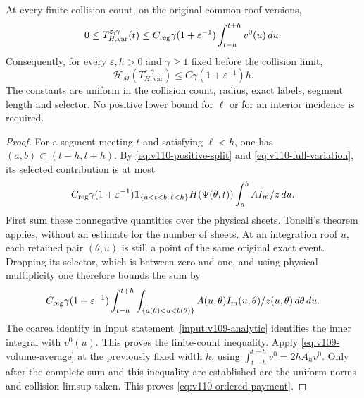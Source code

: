 \begin{theorem}
\label{thm:v110-payment}
At every finite collision count, on the original common roof versions,
\begin{equation}\label{eq:v110-finite-payment}
 0\le T_{H,\mathrm{var}}^{\varepsilon,\gamma}(t)
 \le C_{\rm reg}\gamma(1+\varepsilon^{-1})
                         \int_{t-h}^{t+h}v^0(u)\,du.
\end{equation}
Consequently, for every $\varepsilon,h>0$ and $\gamma\ge1$ fixed
before the collision limit,
\begin{equation}\label{eq:v110-ordered-payment}
 \mathcal H_M(T_{H,\mathrm{var}}^{\varepsilon,\gamma})
                  \le C\gamma(1+\varepsilon^{-1})h.
\end{equation}
The constants are uniform in the collision count, radius, exact
labels, segment length and selector. No positive lower bound for
$\ell$ or for an interior incidence is required.
\end{theorem}
\begin{proof}
For a segment meeting $t$ and satisfying $\ell<h$, one has
$(a,b)\subset(t-h,t+h)$. By \eqref{eq:v110-positive-split} and
\eqref{eq:v110-full-variation}, its selected contribution is at most
\[
 C_{\rm reg}\gamma(1+\varepsilon^{-1})
 \mathbf1_{\{a<t<b,\,\ell<h\}}H(\Psi(\theta,t))
             \int_a^b AI_m/z\,du.
\]
First sum these nonnegative quantities over the physical sheets.
Tonelli's theorem applies, without an estimate for the number of
sheets. At an integration roof $u$, each retained pair $(\theta,u)$
is still a point of the same original exact event. Dropping its
selector, which is between zero and one, and using physical
multiplicity one therefore bounds the sum by
\[
 C_{\rm reg}\gamma(1+\varepsilon^{-1})
 \int_{t-h}^{t+h}\int_{\{a(\theta)<u<b(\theta)\}}
              A(u,\theta)I_m(u,\theta)/z(u,\theta)\,d\theta\,du.
\]
The coarea identity in Input statement~\ref{input:v109-analytic}
identifies the inner integral with $v^0(u)$. This proves the
finite-count inequality. Apply \eqref{eq:v109-volume-average} at
the previously fixed width $h$, using
$\int_{t-h}^{t+h}v^0=2hA_hv^0$. Only after the complete sum and this
inequality are established are the uniform norms and collision
limsup taken. This proves \eqref{eq:v110-ordered-payment}.
\end{proof}

